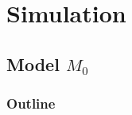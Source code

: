 \documentclass[color=usenames,dvipsnames]{beamer}\usepackage[]{graphicx}\usepackage[]{color}
\begin{document}
\section{Simulation}





\subsection{Model $M_0$}




\begin{frame}
  \frametitle{Outline}
  \Large
  \tableofcontents[currentsection]
\end{frame}
\end{document}
